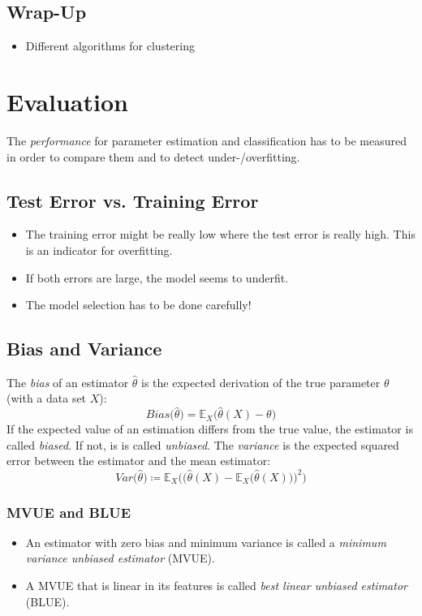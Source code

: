 \documentclass[a4paper, 11pt, accentcolor = tud3b]{tudreport}
\newcommand{\E}{\ensuremath{\mathbb{E}}}
\newcommand{\Var}{\ensuremath{\textit{Var}}}
\newcommand{\Bias}{\ensuremath{\textit{Bias}}}
\begin{document}
		\section{Wrap-Up}
			\begin{itemize}
				\item Different algorithms for clustering
			\end{itemize}

	\chapter{Evaluation}
		The \emph{performance} for parameter estimation and classification has to be measured in order to compare them and to detect under-/overfitting.

		\section{Test Error vs. Training Error}
			\begin{itemize}
				\item The training error might be really low where the test error is really high. This is an indicator for overfitting.
				\item If both errors are large, the model seems to underfit.
				\item The model selection has to be done carefully!
			\end{itemize}

		\section{Bias and Variance}
			The \emph{bias} of an estimator \(\hat{\theta}\) is the expected derivation of the true parameter \(\theta\) (with a data set \(X\)):
			\begin{equation}
				\Bias\big(\hat{\theta}\big) = \E_X\big(\hat{\theta}(X) - \theta\big)
			\end{equation}
			If the expected value of an estimation differs from the true value, the estimator is called \emph{biased}. If not, is is called \emph{unbiased}. The \emph{variance} is the expected squared error between the estimator and the mean estimator:
			\begin{equation}
				\Var\big(\hat{\theta}\big) \coloneqq \E_X\bigg( \! \Big( \hat{\theta}(X) - \E_X\big(\hat{\theta}(X)\big) \Big)^2 \bigg)
			\end{equation}

			\subsection{MVUE and BLUE}
				\begin{itemize}
					\item An estimator with zero bias and minimum variance is called a \emph{minimum variance unbiased estimator} (MVUE).
					\item A MVUE that is linear in its features is called \emph{best linear unbiased estimator} (BLUE).
				\end{itemize}
\end{document}
